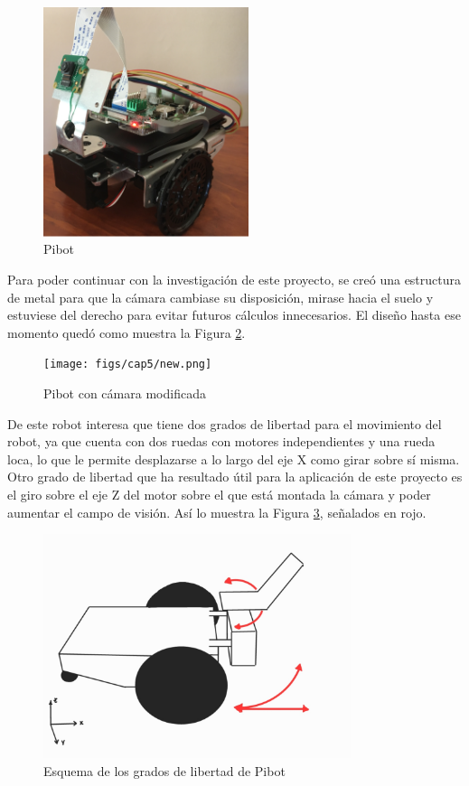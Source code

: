 \begin{figure} [h!]
	\begin{center}
		\includegraphics[width=6cm]{figs/cap5/Original.png}
	\end{center}
	\caption{Pibot} 
	\label{fig:pibot}
\end{figure}

Para poder continuar con la investigación de este proyecto, se creó una estructura de metal para que la cámara cambiase su disposición, mirase hacia el suelo y estuviese del derecho para evitar futuros cálculos innecesarios. El diseño hasta ese momento quedó como muestra la Figura \ref{fig:pibotmetal}.


\begin{figure} [h!]
	\begin{center}
		\texttt{[image: figs/cap5/new.png]}
	\end{center}
	\caption{Pibot con cámara modificada} 
	\label{fig:pibotmetal}
\end{figure}


De este robot interesa que tiene dos grados de libertad para el movimiento del robot, ya que cuenta con dos ruedas con motores independientes y una rueda loca, lo que le permite desplazarse a lo largo del eje X como girar sobre sí misma. Otro grado de libertad que ha resultado útil para la aplicación de este proyecto es el giro sobre el eje Z del motor sobre el que está montada la cámara y poder aumentar el campo de visión. Así lo muestra la Figura \ref{fig:esquemaDOF}, señalados en rojo.


\begin{figure} [h!]
	\begin{center}
		\includegraphics[width=9cm]{figs/cap5/dof.jpg}
	\end{center}
	\caption{Esquema de los grados de libertad de Pibot} 
	\label{fig:esquemaDOF}
\end{figure}


